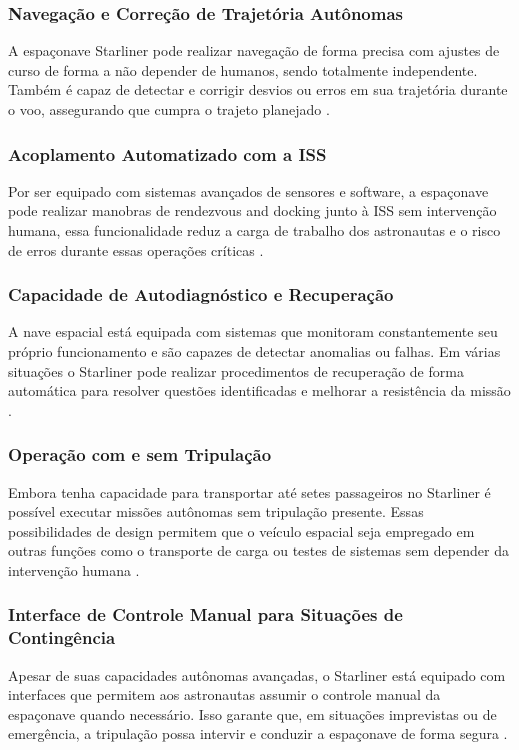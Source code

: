 \subsubsection{Navegação e Correção de Trajetória Autônomas}
A espaçonave Starliner pode realizar navegação de forma precisa com ajustes de curso de forma a não depender de humanos, sendo totalmente independente. Também é capaz de detectar e corrigir desvios ou erros em sua trajetória durante o voo, assegurando que cumpra o trajeto planejado \cite{boeing2024}.

\subsubsection{Acoplamento Automatizado com a ISS}
Por ser equipado com sistemas avançados de sensores e software, a espaçonave pode realizar manobras de rendezvous and docking junto à ISS sem intervenção humana, essa funcionalidade reduz a carga de trabalho dos astronautas e o risco de erros durante essas operações críticas \cite{boeing2024}.

\subsubsection{Capacidade de Autodiagnóstico e Recuperação}
A nave espacial está equipada com sistemas que monitoram constantemente seu próprio funcionamento e são capazes de detectar anomalias ou falhas. Em várias situações o Starliner pode realizar procedimentos de recuperação de forma automática para resolver questões identificadas e melhorar a resistência da missão \cite{boeing2024}.

\subsubsection{Operação com e sem Tripulação}
Embora tenha capacidade para transportar até setes passageiros no Starliner é possível executar missões autônomas sem tripulação presente. Essas possibilidades de design permitem que o veículo espacial seja empregado em outras funções como o transporte de carga ou testes de sistemas sem depender da intervenção humana \cite{boeing2024}.

\subsubsection{Interface de Controle Manual para Situações de Contingência}
Apesar de suas capacidades autônomas avançadas, o Starliner está equipado com interfaces que permitem aos astronautas assumir o controle manual da espaçonave quando necessário. Isso garante que, em situações imprevistas ou de emergência, a tripulação possa intervir e conduzir a espaçonave de forma segura \cite{boeing2024}.




